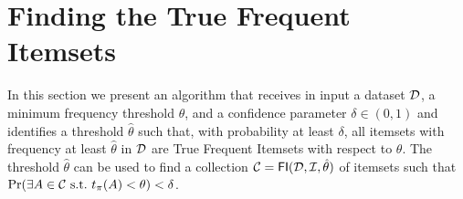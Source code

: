 \section{Finding the True Frequent Itemsets}\label{sec:main}
In this section we present an algorithm that receives in input a dataset ${\cal D}$,
a minimum frequency threshold $\theta$, and a confidence parameter
$\delta\in(0,1)$ and identifies a threshold $\hat{\theta}$ such that, with
probability at least $\delta$, all itemsets with frequency at least
$\hat{\theta}$ in ${\cal D}$ are True Frequent Itemsets with respect to $\theta$. The
threshold $\hat{\theta}$ can be used to find a collection
$\mathcal{C}=\mathsf{FI}({\cal D},{\cal I},\hat\theta)$ of itemsets such that $\Pr(\exists
A\in\mathcal{C} \mbox{ s.t.~} t_\pi(A)<\theta)<\delta$.





